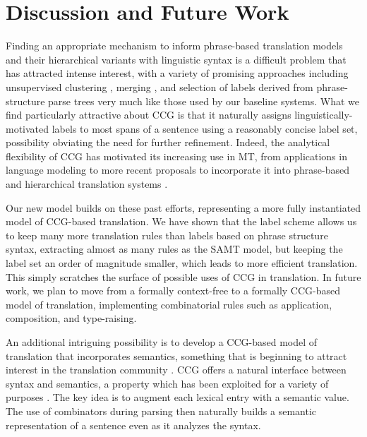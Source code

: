 \documentclass[a4paper]{article}
\begin{document}
\section{Discussion and Future Work}

Finding an appropriate mechanism to inform phrase-based translation models and their hierarchical variants with linguistic
syntax is a difficult problem that has attracted intense interest, with a variety of promising approaches including
unsupervised clustering \cite{zollmann+vogel:2011:acl}, merging \cite{hanneman+etal:2011}, and selection \cite{hassan+etal:2007:acl}
of labels derived from phrase-structure parse trees very much like those used by our baseline systems. What we find
particularly attractive about CCG is that it naturally assigns linguistically-motivated labels to most spans of a
sentence using a reasonably concise label set, possibility obviating the need for further refinement. Indeed, the 
analytical flexibility of CCG has motivated its increasing use in MT, from applications in language modeling
\cite{birch+etal:2007:wmt,hassan+etal:2007:acl} to more recent proposals to incorporate it into phrase-based
\cite{mehay:2010:proposal} and hierarchical translation systems \cite{auli:2009:first-year}. 

Our new model builds on these past efforts, representing a more fully instantiated model of CCG-based
translation. We have shown that the label scheme allows us to keep many more translation rules than labels based on phrase 
structure syntax, extracting almost as many rules as the SAMT model, but keeping the label set an order of
magnitude smaller, which leads to more efficient translation. This simply scratches the surface of possible
uses of CCG in translation. In future work, we plan to move from a formally context-free to a formally CCG-based
model of translation, implementing combinatorial rules such as application, composition, and type-raising. 

An additional intriguing possibility is to develop a CCG-based model of translation that incorporates semantics,
something that is beginning to attract interest in the translation community \cite{wu+fung:2009:naacl}.
CCG offers a natural interface between syntax and semantics, a property which has been exploited for
a variety of purposes \cite{bos+etal:2004:coling,white+baldridge:2003:enlg,zettlemoyer+collins:2005:uai}.
The key idea is to augment each lexical entry with a semantic value. The use of combinators during parsing then 
naturally builds a semantic representation of a sentence even as it analyzes the syntax.
\end{document}
